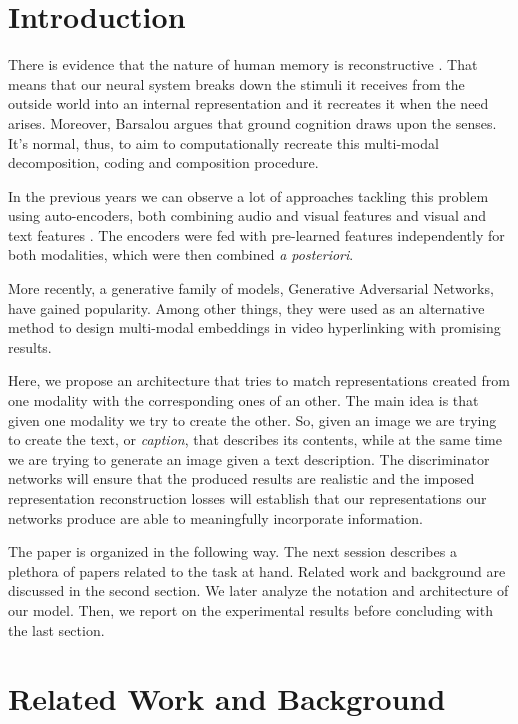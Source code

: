 \documentclass[twocolumn]{article}
\begin{document}
\section{Introduction}

There is evidence that the nature of human memory is reconstructive \cite{ACS, onInt}. That means that our neural system breaks down the stimuli it receives from the outside world into an internal representation and it recreates it when the need arises. Moreover, Barsalou\cite{doi:10.1146/annurev.psych.59.103006.093639} argues that ground cognition draws upon the senses. It's normal, thus, to aim to computationally recreate this multi-modal decomposition, coding and composition procedure.

In the previous years we can observe a lot of approaches tackling this problem using auto-encoders, both combining audio and visual features \cite{conf/icml/NgiamKKNLN11} and visual and text features \cite{silberer2014learning}. The encoders were fed with pre-learned features independently for both modalities, which were then combined \textit{a posteriori}. 

More recently, a generative family of models, Generative Adversarial Networks, have gained popularity. Among other things, they were used as an alternative method to design multi-modal embeddings in video hyperlinking with promising results\cite{DBLP:journals/corr/VukoticRG17}.

Here, we propose an architecture that tries to match representations created from one modality with the corresponding ones of an other. The main idea is that given one modality we try to create the other. So, given an image we are trying to create the text, or \textit{caption}, that describes its contents, while at the same time we are trying to generate an image given a text description. The discriminator networks will ensure that the produced results are realistic and the imposed representation reconstruction losses will establish that our representations our networks produce are able to meaningfully incorporate information.

The paper is organized in the following way. The next session describes a plethora of papers related to the task at hand. Related work and background are discussed in the second section. We later analyze the notation and architecture of our model. Then, we report on the experimental results before concluding with the last section.


\section{Related Work and Background}
\end{document}
